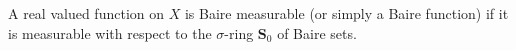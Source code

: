 A real valued function on $X$ is Baire measurable (or simply a Baire function) if it is measurable with respect to the $\sigma$-ring $\mathbf{S}_0$ of Baire sets.
